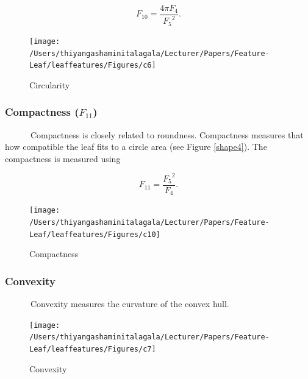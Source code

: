 \documentclass{article}
\begin{document}
\begin{equation}
    F_{10} = \frac{4 \pi F_4}{{F_5}^2}.
\label{calround}
\end{equation}

\begin{figure}[!ht]

{\centering \texttt{[image: /Users/thiyangashaminitalagala/Lecturer/Papers/Feature-Leaf/leaffeatures/Figures/c6]} 

}

\caption{\label{shape3}Circularity}\label{fig:unnamed-chunk-21}
\end{figure}

\hypertarget{compactness-f_11}{%
\subsubsection{\texorpdfstring{Compactness
(\(F_{11}\))}{Compactness (F\_\{11\})}}\label{compactness-f_11}}

~~~~~~Compactness is closely related to roundness. Compactness measures
that how compatible the leaf fits to a circle area (see Figure
\ref{shape4}). The compactness is measured using

\begin{equation}
    F_{11} = \frac{{F_5}^2}{F_4}.
\label{calcompact}
\end{equation}

\begin{figure}[!ht]

{\centering \texttt{[image: /Users/thiyangashaminitalagala/Lecturer/Papers/Feature-Leaf/leaffeatures/Figures/c10]} 

}

\caption{\label{shape4}Compactness}\label{fig:unnamed-chunk-22}
\end{figure}

\hypertarget{convexity}{%
\subsubsection{Convexity}\label{convexity}}

~~~~~~Convexity measures the curvature of the convex hull.

\begin{figure}[!ht]

{\centering \texttt{[image: /Users/thiyangashaminitalagala/Lecturer/Papers/Feature-Leaf/leaffeatures/Figures/c7]} 

}

\caption{\label{shape7}Convexity}\label{fig:unnamed-chunk-23}
\end{figure}
\end{document}
